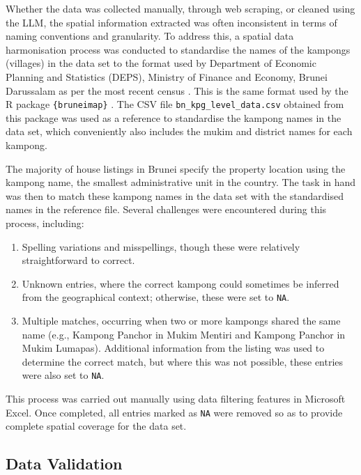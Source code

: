 \documentclass[
  number]{elsarticle}
\providecommand{\tightlist}{%
  \setlength{\itemsep}{0pt}\setlength{\parskip}{0pt}}\usepackage{longtable,booktabs,array}
\begin{document}
Whether the data was collected manually, through web scraping, or
cleaned using the LLM, the spatial information extracted was often
inconsistent in terms of naming conventions and granularity. To address
this, a spatial data harmonisation process was conducted to standardise
the names of the kampongs (villages) in the data set to the format used
by Department of Economic Planning and Statistics (DEPS), Ministry of
Finance and Economy, Brunei Darussalam as per the most recent census
\citep{deps2022population}. This is the same format used by the R
package \texttt{\{bruneimap\}} \citep{jamil2024bruneimap}. The CSV file
\texttt{bn\_kpg\_level\_data.csv} obtained from this package was used as
a reference to standardise the kampong names in the data set, which
conveniently also includes the mukim and district names for each
kampong.

The majority of house listings in Brunei specify the property location
using the kampong name, the smallest administrative unit in the country.
The task in hand was then to match these kampong names in the data set
with the standardised names in the reference file. Several challenges
were encountered during this process, including:

\begin{enumerate}
\def\labelenumi{\arabic{enumi}.}
\tightlist
\item
  Spelling variations and misspellings, though these were relatively
  straightforward to correct.
\item
  Unknown entries, where the correct kampong could sometimes be inferred
  from the geographical context; otherwise, these were set to
  \texttt{NA}.
\item
  Multiple matches, occurring when two or more kampongs shared the same
  name (e.g., Kampong Panchor in Mukim Mentiri and Kampong Panchor in
  Mukim Lumapas). Additional information from the listing was used to
  determine the correct match, but where this was not possible, these
  entries were also set to \texttt{NA}.
\end{enumerate}

This process was carried out manually using data filtering features in
Microsoft Excel. Once completed, all entries marked as \texttt{NA} were
removed so as to provide complete spatial coverage for the data set.

\subsection{Data Validation}\label{sec-data-validation}
\end{document}
